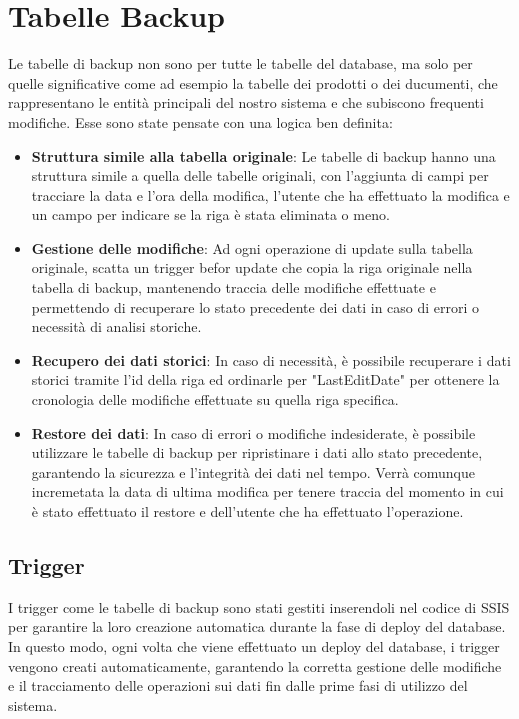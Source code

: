 \documentclass[12pt, a4paper]{article}
\begin{document}
\section{Tabelle Backup}
Le tabelle di backup non sono per tutte le tabelle del database, ma solo per quelle significative come 
ad esempio la tabelle dei prodotti o dei ducumenti, che rappresentano le entità principali del nostro sistema
e che subiscono frequenti modifiche.
Esse sono state pensate con una logica ben definita:
\begin{itemize}
    \item \textbf{Struttura simile alla tabella originale}: Le tabelle di backup hanno una struttura simile a quella delle tabelle originali, con l'aggiunta di campi per tracciare la data e l'ora della modifica, l'utente che ha effettuato la modifica e un campo per indicare se la riga è stata eliminata o meno.
    \item \textbf{Gestione delle modifiche}: Ad ogni operazione di update sulla tabella originale, scatta un trigger befor update che copia la riga
    originale nella tabella di backup, mantenendo traccia delle modifiche effettuate e permettendo di recuperare lo stato precedente dei dati in caso di errori o necessità di analisi storiche.
    \item \textbf{Recupero dei dati storici}: In caso di necessità, è possibile recuperare i dati storici tramite l'id della riga ed ordinarle per "LastEditDate" per ottenere la cronologia delle modifiche effettuate su quella riga specifica.
    \item \textbf{Restore dei dati}: In caso di errori o modifiche indesiderate, è possibile utilizzare le tabelle di backup
    per ripristinare i dati allo stato precedente, garantendo la sicurezza e l'integrità dei dati nel tempo.
    Verrà comunque incremetata la data di ultima modifica per tenere traccia del momento in cui è stato effettuato il restore
    e dell'utente che ha effettuato l'operazione.
\end{itemize}
\subsection{Trigger}
I trigger come le tabelle di backup sono stati gestiti inserendoli nel codice di SSIS per garantire la loro creazione automatica durante la fase di deploy del database.
In questo modo, ogni volta che viene effettuato un deploy del database, i trigger vengono creati automaticamente, garantendo la corretta gestione delle modifiche e
il tracciamento delle operazioni sui dati fin dalle prime fasi di utilizzo del sistema.
\end{document}
